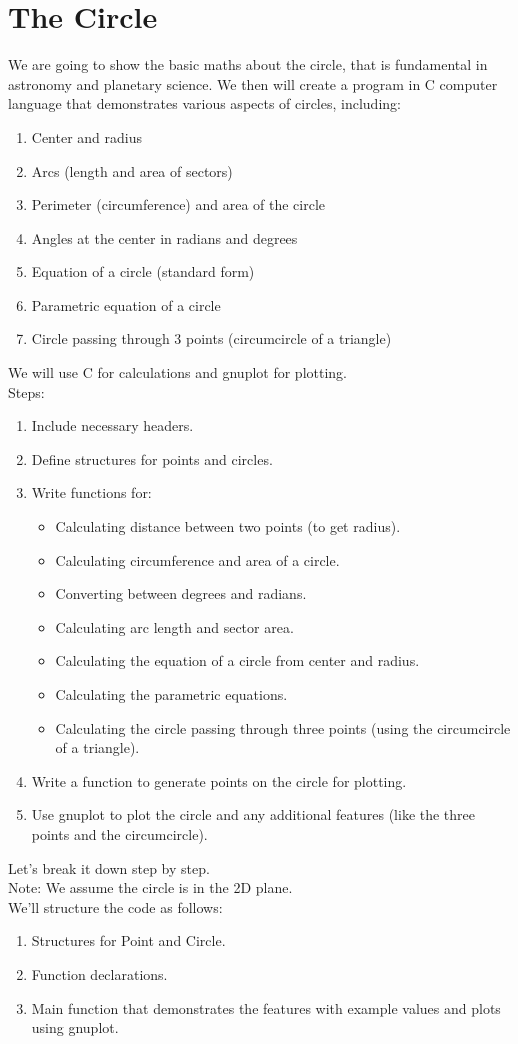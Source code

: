 \documentclass[a4paper,14pt]{article}
\begin{document}
\section{The Circle}
We are going to show the basic maths about the circle, that is fundamental in astronomy and planetary science. We then
will create a program in C computer language that demonstrates various aspects of circles, including:\\
\begin{enumerate}
\item Center and radius
\item Arcs (length and area of sectors)
\item Perimeter (circumference) and area of the circle
\item Angles at the center in radians and degrees
\item Equation of a circle (standard form)
\item Parametric equation of a circle
\item Circle passing through 3 points (circumcircle of a triangle)
\end{enumerate}
We will use C for calculations and gnuplot for plotting.\\
Steps:
\begin{enumerate}
\item Include necessary headers.
\item Define structures for points and circles.
\item Write functions for:
    \begin{itemize}
    \item Calculating distance between two points (to get radius).
    \item Calculating circumference and area of a circle.
    \item Converting between degrees and radians.
    \item Calculating arc length and sector area.
    \item Calculating the equation of a circle from center and radius.
    \item Calculating the parametric equations.
    \item Calculating the circle passing through three points (using the circumcircle of a triangle).
    \end{itemize}
\item Write a function to generate points on the circle for plotting.
\item Use gnuplot to plot the circle and any additional features (like the three points and the circumcircle).
\end{enumerate}
Let's break it down step by step.\\
Note: We assume the circle is in the 2D plane.\\
We'll structure the code as follows:
\begin{enumerate}
\item Structures for Point and Circle.
\item Function declarations.
\item Main function that demonstrates the features with example values and plots using gnuplot.
\end{enumerate}
\end{document}

